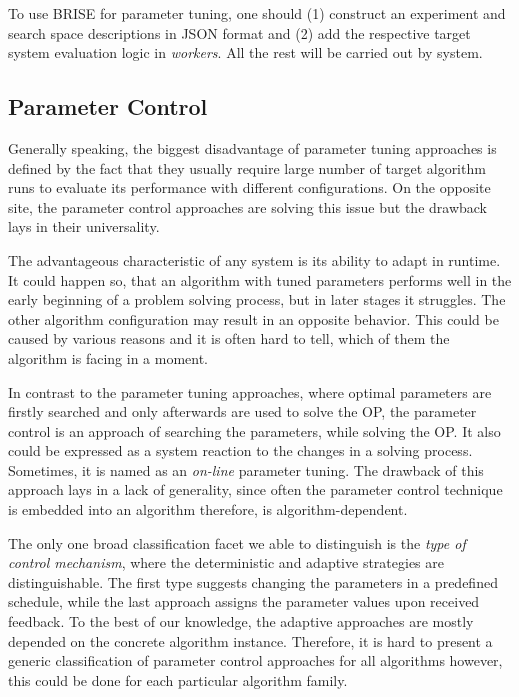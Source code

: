 To use BRISE for parameter tuning, one should (1) construct an experiment and search space descriptions in JSON format and (2) add the respective target system evaluation logic in \emph{workers}. All the rest will be carried out by system.


\subsection{Parameter Control}\label{bg: parameter control}
Generally speaking, the biggest disadvantage of parameter tuning approaches is defined by the fact that they usually require large number of target algorithm runs to evaluate its performance with different configurations. On the opposite site, the parameter control approaches are solving this issue but the drawback lays in their universality.

The advantageous characteristic of any system is its ability to adapt in runtime.
It could happen so, that an algorithm with tuned parameters performs well in the early beginning of a problem solving process, but in later stages it struggles. The other algorithm configuration may result in an opposite behavior. This could be caused by various reasons and it is often hard to tell, which of them the algorithm is facing in a moment. 

In contrast to the parameter tuning approaches, where optimal parameters are firstly searched and only afterwards are used to solve the OP, the parameter control is an approach of searching the parameters, while solving the OP. It also could be expressed as a system reaction to the changes in a solving process. Sometimes, it is named as an \emph{on-line} parameter tuning. The drawback of this approach lays in a lack of generality, since often the parameter control technique is embedded into an algorithm therefore, is algorithm-dependent.

The only one broad classification facet we able to distinguish is the \emph{type of control mechanism}, where the deterministic and adaptive strategies are distinguishable. The first type suggests changing the parameters in a predefined schedule, while the last approach assigns the parameter values upon received feedback. To the best of our knowledge, the adaptive approaches are mostly depended on the concrete algorithm instance. Therefore, it is hard to present a generic classification of parameter control approaches for all algorithms however, this could be done for each particular algorithm family.


